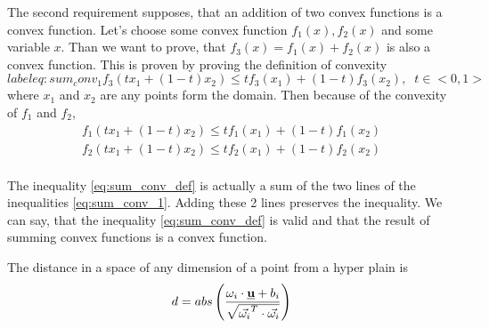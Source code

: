 \documentclass{article}
\newcommand{\uvec}{\textbf{\underline{u}}}
\begin{document}
The second requirement supposes, that an addition of two convex functions is a convex function. Let's choose some convex function $f_1(x), f_2(x)$ and some variable $x$. Than we want to prove, that $f_3(x) = f_1(x) + f_2(x)$ is also a convex function. This is proven by proving the definition of convexity 
\begin{equation}label{eq:sum_conv_1}
\label{eq:sum_conv_def}
f_3(tx_1+(1-t)x_2) \leq tf_3(x_1) + (1-t)f_3(x_2), \;\; t  \in  <0, 1>
\end{equation}
where $x_1$ and $x_2$ are any points form the domain. Then because of the convexity of $f_1$ and $f_2$,
\begin{equation}
\label{eq:sum_conv_1}
\begin{split}
f_1(tx_1+(1-t)x_2) \leq tf_1(x_1) + (1-t)f_1(x_2)\\
f_2(tx_1+(1-t)x_2) \leq tf_2(x_1) + (1-t)f_2(x_2)\\
\end{split}
\end{equation}

The inequality \ref{eq:sum_conv_def} is actually a sum of the two lines of the inequalities \ref{eq:sum_conv_1}. Adding these 2 lines preserves the inequality. We can say, that the inequality \ref{eq:sum_conv_def} is valid and that the result of summing convex functions is a convex function. 

The distance in a space of any dimension of a point from a hyper plain is 
\begin{equation}
\label{eq:plain_distance}
d = abs\left(\frac{\omega_i \cdot \uvec + b_i}{\sqrt{\vec{\omega_i}^T \cdot \vec{\omega_i}}}\right)
\end{equation}
\end{document}
